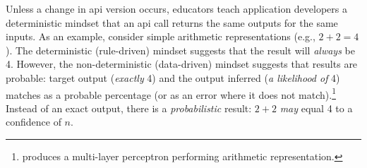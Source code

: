 Unless a change in \gls{api} version occurs, educators teach application developers a deterministic mindset that an \gls{api} call returns the same outputs for the same inputs. As an example, consider simple arithmetic representations (e.g., $2+2=4$). The deterministic (rule-driven) mindset suggests that the result will \textit{always} be 4. However, the non-deterministic (data-driven) mindset suggests that results are probable: target output (\textit{exactly} 4) and the output inferred (\textit{a likelihood of} 4) matches as a probable percentage (or as an error where it does not match).\footnote{\citet{Blake:1998vd} produces a multi-layer perceptron  performing arithmetic representation.} Instead of an exact output, there is a \textit{probabilistic} result: $2+2$ \textit{may} equal 4 to a confidence of $n$. 

